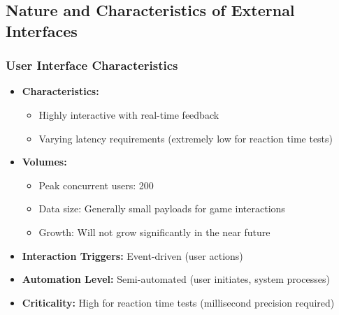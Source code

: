 





\subsection{Nature and Characteristics of External Interfaces}

\subsubsection{User Interface Characteristics}


\begin{itemize}
    \item \textbf{Characteristics:}
          \begin{itemize}
              \item Highly interactive with real-time feedback
              \item Varying latency requirements (extremely low for reaction
                    time tests)
          \end{itemize}
    \item \textbf{Volumes:}
          \begin{itemize}
              \item Peak concurrent users: 200
              \item Data size: Generally small payloads for game interactions
              \item Growth: Will not grow significantly in the near future
          \end{itemize}
    \item \textbf{Interaction Triggers:} Event-driven (user actions)
    \item \textbf{Automation Level:} Semi-automated (user initiates, system processes)
    \item \textbf{Criticality:} High for reaction time tests (millisecond precision required)
\end{itemize}

